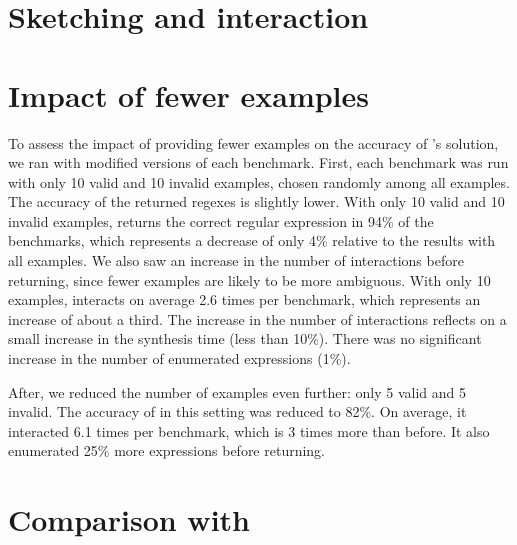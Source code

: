\section{Sketching and interaction}

\section{Impact of fewer examples} \label{sec:fewer-exs}
To assess the impact of providing fewer examples on the accuracy of \Forest{}'s solution, we ran \Forest{} with modified versions of each benchmark.
First, each benchmark was run with only 10 valid and 10 invalid examples, chosen randomly among all examples. The accuracy of the returned regexes is slightly lower.
With only 10 valid and 10 invalid examples, \Forest{} returns the correct regular expression in 94\% of the benchmarks, which represents a decrease of only 4\% relative to the results with all examples.
We also saw an increase in the number of interactions before returning, since fewer examples are likely to be more ambiguous. With only 10 examples, \Forest{} interacts on average 2.6 times per benchmark, which represents an increase of about a third. The increase in the number of interactions reflects on a small increase in the synthesis time (less than 10\%). There was no significant increase in the number of enumerated expressions (1\%).

After, we reduced the number of examples even further: only 5 valid and 5 invalid. The accuracy of \Forest{} in this setting was reduced to 82\%. On average, it interacted 6.1 times per benchmark, which is 3 times more than before. It also enumerated 25\% more expressions before returning.


\section{Comparison with \Regel}\label{sec:comp-regel}
%



